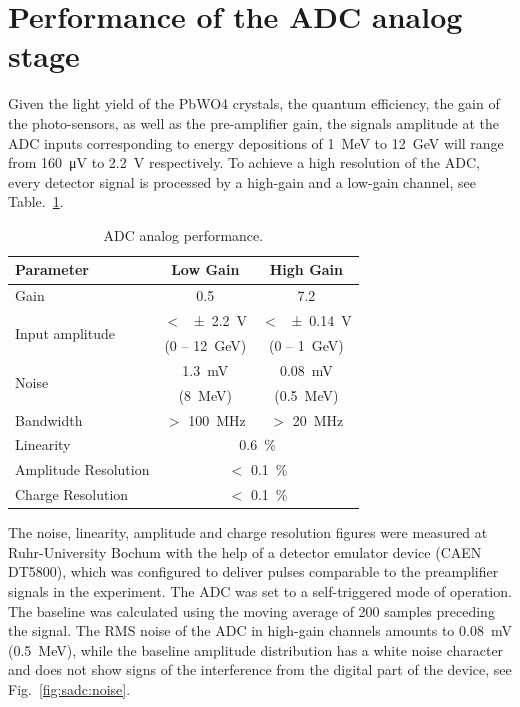 \documentclass[12pt,a4paper, twocolumn]{article}
\newcommand{\Reffig}[1]{Fig.~\ref{#1}}
\newcommand{\Reftbl}[1]{Table.~\ref{#1}}
\begin{document}
\section{Performance of the ADC analog stage}
Given the light yield of the PbWO4 crystals, the quantum efficiency, the gain of the photo-sensors, as well as the pre-amplifier gain, the signals amplitude at the ADC inputs corresponding to energy depositions of \SI{1}{\mega\electronvolt} to \SI{12}{\giga\electronvolt} will range from \SI{160}{\micro\volt} to \SI{2.2}{\volt} respectively. To achieve a high resolution of the ADC, every detector signal is processed by a high-gain and a low-gain channel, see \Reftbl{tab:ADCanpref}.
\begin{table}[htb]
\caption{\label{tab:ADCanpref}ADC analog performance.}
\begin{center}
	\begin{tabular}{p{2cm}cc}
	Parameter&Low Gain&High Gain \\ \hline
	Gain&0.5&7.2 \\ \hline
	\multirow{2}{2cm}{Input amplitude} & $<$ \SI{ \pm2.2}{\volt} & $<$ \SI{ \pm0.14}{\volt} \\
	& (0 -- \SI{12}{\giga\electronvolt}) & (0 -- \SI{1}{\giga\electronvolt})\\ \hline
	\multirow{2}{2cm}{Noise}&\SI{1.3}{\milli\volt}&\SI{0.08}{\milli\volt} \\
	&(\SI{8}{\mega\electronvolt}) &(\SI{0.5}{\mega\electronvolt}) \\ \hline
	Bandwidth&$>$ \SI{100}{\mega\hertz}&$>$ \SI{20}{\mega\hertz}\\ \hline
	Linearity&\multicolumn{2}{c}{ 0.6~\%}\\ \hline
	Amplitude Resolution&\multicolumn{2}{c}{ $<$ 0.1~\%} \\ \hline
	Charge Resolution&\multicolumn{2}{c}{ $<$ 0.1~\%} \\ \hline
	\end{tabular}
\end{center}
\end{table}
The noise, linearity, amplitude and charge resolution figures were measured at Ruhr-University Bochum with the help of a detector emulator device (CAEN DT5800), which was configured to deliver pulses comparable to the preamplifier signals in the experiment. The ADC was set to a self-triggered mode of operation. The baseline was calculated using the moving average of 200 samples preceding the signal.
The RMS noise of the ADC in high-gain channels amounts to \SI{0.08}{\milli\volt} (\SI{0.5}{\mega\electronvolt}), while the baseline amplitude distribution has a white noise character and does not show signs of the interference from the digital part of the device, see \Reffig{fig:sadc:noise}.
\end{document}
